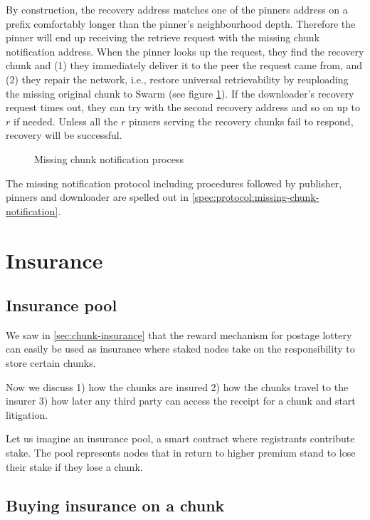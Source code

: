 By construction, the recovery address matches one of the pinners address on a prefix comfortably longer than the pinner's neighbourhood depth. Therefore the pinner will end up receiving the retrieve request with the missing chunk notification address. When the pinner looks up the request, they find the recovery chunk and (1) they immediately deliver it to the peer the request came from, and (2) they repair the network, i.e., restore universal retrievability by reuploading the missing original chunk to Swarm (see figure \ref{fig:missing-chunk-notification}).  If the downloader's recovery request times out, they can try with the second recovery address and so on up to $r$ if needed. Unless all the $r$ pinners serving the recovery chunks fail to respond, recovery will be successful. 

\begin{figure}[htbp]
  \centering
  \caption[Missing chunk notification process]{Missing chunk notification process}
  \label{fig:missing-chunk-notification}
\end{figure}

The missing notification protocol including procedures followed by publisher, pinners and downloader are spelled out in  \ref{spec:protocol:missing-chunk-notification}.




\section{Insurance}\label{sec:insurance}
 

\subsection{Insurance pool}
We saw in \ref{sec:chunk-insurance} that the reward mechanism for postage lottery can easily be used as insurance where staked nodes take on the responsibility to store certain chunks. 

Now we discuss  1) how the chunks are insured 2) how the chunks travel to the insurer 3) how later any third party can access the receipt for a chunk and start litigation.

Let us imagine an insurance pool, a smart contract where registrants contribute stake. The pool represents nodes that in return to higher premium stand to lose their stake if they lose a chunk. 

\subsection{Buying insurance on a chunk}

